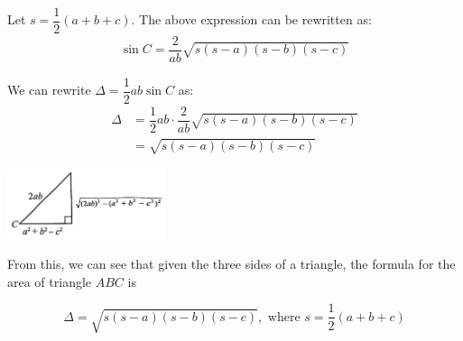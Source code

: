 \documentclass{report}
\begin{document}
    \vspace{-1.5em}
    \begin{vwcol}[widths={0.6,0.4}, sep=8mm, rule=0pt]
        ~
        
        \vspace{-1.1em}
        Let $s = \dfrac{1}{2}(a + b + c)$. The above expression can be rewritten as:
    \begin{align*}
        \sin C = \dfrac{2}{ab} \sqrt{s(s - a)(s - b)(s - c)}
    \end{align*}

    \vspace{-1em}
    We can rewrite $\Delta = \dfrac{1}{2}ab\sin C$ as:
    \begin{align*}
        \Delta &= \dfrac{1}{2}ab \cdot \dfrac{2}{ab} \sqrt{s(s - a)(s - b)(s - c)} \\
        &= \sqrt{s(s - a)(s - b)(s - c)}
    \end{align*}
    \vspace{3em}

    \includegraphics[width=0.35\textwidth]{assets/10-42.jpg}
    \end{vwcol}

    From this, we can see that given the three sides of a triangle, the formula for the area of triangle $ABC$ is
    
    \begin{info}
        $$
        \Delta = \sqrt{s(s - a)(s - b)(s - c)}, \text{ where } s = \dfrac{1}{2}(a + b + c)
        $$
    \end{info}
\end{document}
